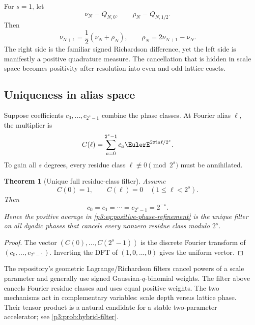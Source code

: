\documentclass[11pt,oneside]{article}
\numberwithin{equation}{section}
\newtheorem{theorem}{Theorem}[section]
\theoremstyle{definition}
\theoremstyle{remark}
\begin{document}
For $s=1$, let
\[
 \nu_N=Q_{N,0},
 \qquad
 \rho_N=Q_{N,1/2}.
\]
Then
\begin{equation}
 \nu_{N+1}=\frac12(\nu_N+\rho_N),
 \qquad
 \boxed{\rho_N=2\nu_{N+1}-\nu_N.}
 \label{p3:eq:midpoint-Richardson}
\end{equation}
The right side is the familiar signed Richardson difference, yet the left side is manifestly a positive quadrature measure.  The cancellation that is hidden in scale space becomes positivity after resolution into even and odd lattice cosets.

\subsection{Uniqueness in alias space}

Suppose coefficients $c_0,\ldots,c_{2^s-1}$ combine the phase classes.  At Fourier alias $\ell$, the multiplier is
\begin{equation}
 C(\ell)=\sum_{a=0}^{2^s-1}c_a\EulerE^{2\pi\iu a\ell/2^s}.
 \label{p3:eq:DFT-filter}
\end{equation}
To gain all $s$ degrees, every residue class $\ell\not\equiv0\pmod{2^s}$ must be annihilated.

\begin{theorem}[Unique full residue-class filter]
\label{p3:thm:unique-phase-filter}
Assume
\begin{equation}
 C(0)=1,
 \qquad
 C(\ell)=0\quad(1\le\ell<2^s).
 \label{p3:eq:DFT-conditions}
\end{equation}
Then
\begin{equation}
 c_0=c_1=\cdots=c_{2^s-1}=2^{-s}.
 \label{p3:eq:unique-uniform-filter}
\end{equation}
Hence the positive average in \eqref{p3:eq:positive-phase-refinement} is the unique filter on all dyadic phases that cancels every nonzero residue class modulo $2^s$.
\end{theorem}

\begin{proof}
The vector $(C(0),\ldots,C(2^s-1))$ is the discrete Fourier transform of $(c_0,\ldots,c_{2^s-1})$.  Inverting the DFT of $(1,0,\ldots,0)$ gives the uniform vector.
\end{proof}

\begin{remark}
The repository's geometric Lagrange/Richardson filters cancel powers of a scale parameter and generally use signed Gaussian-$q$-binomial weights.  The filter above cancels Fourier residue classes and uses equal positive weights.  The two mechanisms act in complementary variables: scale depth versus lattice phase.  Their tensor product is a natural candidate for a stable two-parameter accelerator; see \cref{p3:prob:hybrid-filter}.
\end{remark}
\end{document}

